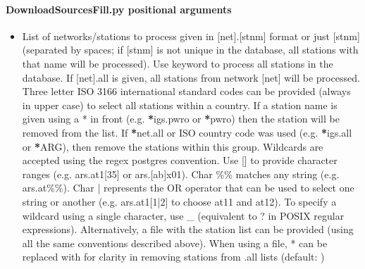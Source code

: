 \documentclass[letterpaper,10pt,english]{sphinxmanual}
\begin{document}
\paragraph{DownloadSourcesFill.py positional arguments}
\label{\detokenize{com:DownloadSourcesFill.py-positional-arguments}}\begin{itemize}
\item {} 
\sphinxAtStartPar
{\hyperref[\detokenize{com:DownloadSourcesFill.py-all|net.stnm}]{}} \sphinxhyphen{} List of networks/stations to process given in {[}net{]}.{[}stnm{]} format or just {[}stnm{]} (separated by spaces; if {[}stnm{]} is not unique in the database, all stations with that name will be processed). Use keyword  to process all stations in the database. If {[}net{]}.all is given, all stations from network {[}net{]} will be processed. Three letter ISO 3166 international standard codes can be provided (always in upper case) to select all stations within a country. If a station name is given using a * in front (e.g. {\color{red}\bfseries{}*}igs.pwro or {\color{red}\bfseries{}*}pwro) then the station will be removed from the list. If {\color{red}\bfseries{}*}net.all or ISO country code was used (e.g. {\color{red}\bfseries{}*}igs.all or {\color{red}\bfseries{}*}ARG), then remove the stations within this group. Wildcards are accepted using the regex postgres convention. Use {[}{]} to provide character ranges (e.g. ars.at1{[}3\sphinxhyphen{}5{]} or ars.{[}a\sphinxhyphen{}b{]}x01). Char \%\% matches any string (e.g. ars.at\%\%). Char | represents the OR operator that can be used to select one string or another (e.g. ars.at1{[}1|2{]} to choose at11 and at12). To specify a wildcard using a single character, use \_ (equivalent to ? in POSIX regular expressions). Alternatively, a file with the station list can be provided (using all the same conventions described above). When using a file, * can be replaced with \sphinxhyphen{} for clarity in removing stations from .all lists (default: )

\end{itemize}
\end{document}
